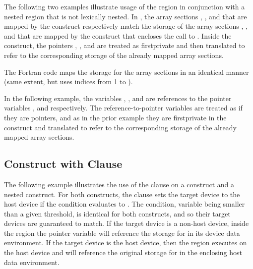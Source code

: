 The following two examples illustrate usage of the  region
in conjunction with a nested  region that is not lexically nested.
In , the array sections , , and
 that are mapped by the  construct
respectively match the storage of the array sections ,
, and  that are mapped by the 
construct that encloses the call to . Inside the 
construct, the pointers , , and  are treated as
firstprivate and then translated to refer to the corresponding storage of the
already mapped array sections.


The Fortran code maps the storage for the array sections in an identical manner
(same extent, but uses indices from 1 to ).



In the following example, the variables , , and 
are references to the pointer variables ,  and 
respectively. The reference-to-pointer variables are treated as if they are
pointers, and as in the prior example they are firstprivate in the
 construct and translated to refer to the corresponding storage of
the already mapped array sections.



\subsection{ Construct with  Clause}
\label{subsec:target_data_if}

The following example illustrates the use of the  clause on a
 construct and a nested  construct.  For both
constructs, the  clause sets the target device to the host device if
the condition evaluates to . The condition, variable 
being smaller than a given threshold, is identical for both constructs, and so
their target devices are guaranteed to match. If the target device is a non-host
device, inside the  region the pointer variable  will
reference the storage for  in its device data environment. If the
target device is the host device, then the  region executes on the
host device and  will reference the original storage for 
in the enclosing host data environment.

